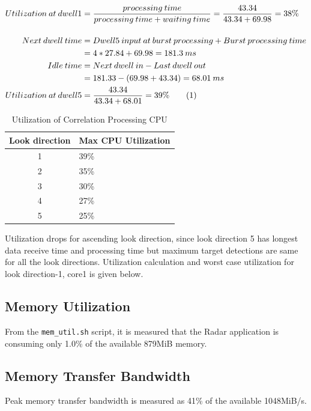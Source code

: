 \begin{align*}
	Utilization \: at \: dwell1 &= \frac{processing \: time}{processing \: time + waiting \: time } = \frac{43.34}{43.34 + 69.98} = 38\% \\[0.4cm]
	Next \: dwell \: time &= Dwell5 \: input \: at \: burst \: processing + Burst \: processing \: time \\
	&= 4 * 27.84 + 69.98 =181.3 \: ms\\
	Idle \: time &= Next \: dwell \: in - Last \: dwell \: out \\
	&= 181.33 - (69.98 + 43.34) = 68.01 \: ms \\
	Utilization \: at \: dwell5 &= 	\frac{43.34}{43.34 + 68.01} = 39\%  \stepcounter{equation}\tag{\theequation}
\end{align*}

\begin{table}[h!]
	\centering
	\begin{tabular}{|c|l|} 
	 \hline
	 \textbf{Look direction} & \textbf{Max CPU Utilization} \\
	 \hline
	 1 & 39\%  \\ \hline
	 2 & 35\%  \\ \hline
	 3 & 30\%  \\ \hline
	 4 & 27\%  \\ \hline
	 5 & 25\%  \\ \hline
	\end{tabular}
	\caption{Utilization of Correlation Processing CPU}
	\label{tbl:mm:scheme4_corr_cpu_util}
\end{table}
Utilization drops for ascending look direction, since look direction 5 has longest data receive time and processing time but maximum target detections are same for all the look directions. Utilization calculation and worst case utilization for look direction-1, core1 is given below. 

\subsection{Memory Utilization}
\label{ss:mm:scheme4:mem_util}
From the \verb|mem_util.sh| script, it is measured that the Radar application is consuming only 1.0\% of the available 879MiB memory.

\subsection{Memory Transfer Bandwidth}
\label{ss:mm:scheme4:bw_util}
Peak memory transfer bandwidth is measured as 41\% of the available 1048MiB/s.

